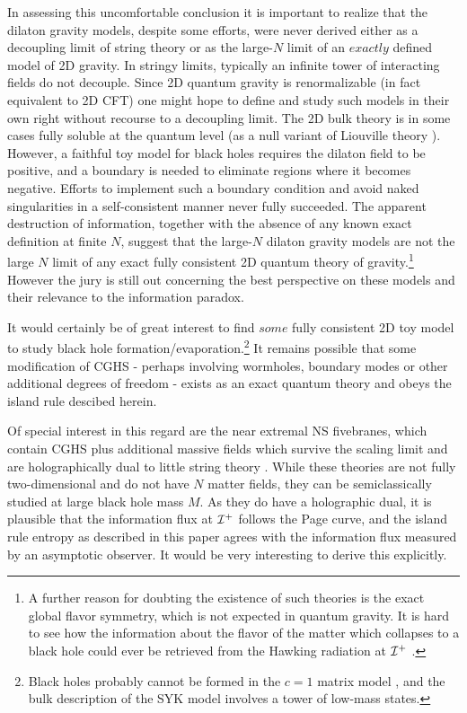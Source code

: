 \documentclass[11pt,oneside,letterpaper]{article}
\def\m{{M}}
\numberwithin{equation}{section}
\begin{document}
In assessing this uncomfortable conclusion it is important to realize that the dilaton gravity models, despite some efforts, were never  
derived either as a decoupling limit of string theory or as the large-$N$ limit of an $exactly$ defined model of 2D gravity.  In stringy limits, typically an infinite tower of interacting fields do not decouple.  Since 2D quantum gravity is renormalizable (in fact equivalent to 2D CFT) one might hope to define and study such models in their own right without recourse to a decoupling limit.  The  2D bulk theory is in some cases fully soluble at the quantum level (as a null variant of Liouville theory  \cite{deAlwis:1992hv,Bilal:1992kv}). However, a faithful toy model for black holes requires the dilaton field to be positive, and a boundary is needed to eliminate regions where it becomes negative.  Efforts to implement such a boundary condition and avoid naked singularities  in a self-consistent manner never fully succeeded. 
The apparent destruction of information, together with the absence of any known exact definition at finite $N$, suggest that the large-$N$ dilaton gravity models are not the large $N$ limit of any exact fully consistent 2D quantum  theory of gravity.\footnote{A further reason for doubting the existence of such theories is the exact global flavor symmetry, which is not expected in quantum gravity. It is hard to see how the information about the flavor of the matter which collapses to a black hole  could ever be retrieved from the Hawking radiation at ${\cal I}^+$ .} However the jury is still out concerning the best perspective on these models and their relevance to the information paradox. 


It would certainly be of great interest to find $some$ fully consistent 2D toy model to study black hole formation/evaporation.\footnote{Black holes probably cannot be formed  in the $c=1$ matrix model \cite{Karczmarek:2004bw}, and the bulk description  of the  SYK model \cite{Sachdev:1992fk,kitaevfirsttalk} involves a tower of low-mass states. } It remains possible that some modification of CGHS - perhaps involving wormholes, boundary modes or other additional degrees of freedom - exists as an exact quantum theory and obeys the island rule descibed herein. 

Of special interest in this regard are the near extremal NS fivebranes, which contain CGHS plus additional massive fields which survive the scaling limit and are  holographically dual to little string theory \cite{Callan:1992rs,Maldacena:1997cg,Aharony:1998ub}. While these theories are not  fully two-dimensional and do not have $N$ matter fields, they can be semiclassically studied at large black hole mass $\m$. As they do have a holographic dual, it is plausible that the information flux at ${\cal I}^+$  follows the Page curve, and the island rule  entropy as described in this paper agrees with the information flux measured by an asymptotic observer.  It would be very interesting to derive this explicitly. 
\end{document}
